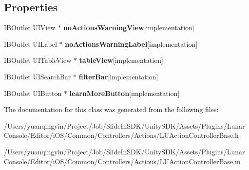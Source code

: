 \subsection*{Properties}
\begin{DoxyCompactItemize}
\item 
\mbox{\label{interface_l_u_action_controller_base_a8e267339781a18f9ae6ae024db9172a2}} 
I\+B\+Outlet U\+I\+View $\ast$ {\bfseries no\+Actions\+Warning\+View}{\ttfamily  \mbox{[}implementation\mbox{]}}
\item 
\mbox{\label{interface_l_u_action_controller_base_a4128135ad6ab13b5aad4ce821f2736d8}} 
I\+B\+Outlet U\+I\+Label $\ast$ {\bfseries no\+Actions\+Warning\+Label}{\ttfamily  \mbox{[}implementation\mbox{]}}
\item 
\mbox{\label{interface_l_u_action_controller_base_a4d22ad5191c169d18180a972a721a762}} 
I\+B\+Outlet U\+I\+Table\+View $\ast$ {\bfseries table\+View}{\ttfamily  \mbox{[}implementation\mbox{]}}
\item 
\mbox{\label{interface_l_u_action_controller_base_a3bd34b63d4c0af438fc33f64e2a666c3}} 
I\+B\+Outlet U\+I\+Search\+Bar $\ast$ {\bfseries filter\+Bar}{\ttfamily  \mbox{[}implementation\mbox{]}}
\item 
\mbox{\label{interface_l_u_action_controller_base_a03b3e7467f021ca5539707989bd8ec4a}} 
I\+B\+Outlet U\+I\+Button $\ast$ {\bfseries learn\+More\+Button}{\ttfamily  \mbox{[}implementation\mbox{]}}
\end{DoxyCompactItemize}


The documentation for this class was generated from the following files\+:\begin{DoxyCompactItemize}
\item 
/\+Users/yuanqingyin/\+Project/\+Job/\+Slide\+In\+S\+D\+K/\+Unity\+S\+D\+K/\+Assets/\+Plugins/\+Lunar\+Console/\+Editor/i\+O\+S/\+Common/\+Controllers/\+Actions/L\+U\+Action\+Controller\+Base.\+h\item 
/\+Users/yuanqingyin/\+Project/\+Job/\+Slide\+In\+S\+D\+K/\+Unity\+S\+D\+K/\+Assets/\+Plugins/\+Lunar\+Console/\+Editor/i\+O\+S/\+Common/\+Controllers/\+Actions/L\+U\+Action\+Controller\+Base.\+m\end{DoxyCompactItemize}
